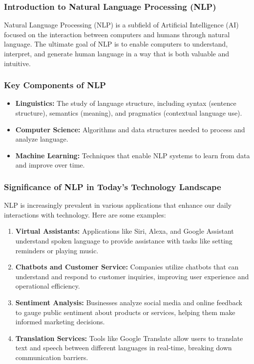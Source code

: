 \documentclass[aspectratio=169]{beamer}
\begin{document}
\frame{\titlepage}

\begin{frame}[fragile]
    \frametitle{Introduction to Natural Language Processing (NLP)}
    Natural Language Processing (NLP) is a subfield of Artificial Intelligence (AI) focused on the interaction between computers and humans through natural language. The ultimate goal of NLP is to enable computers to understand, interpret, and generate human language in a way that is both valuable and intuitive.
\end{frame}

\begin{frame}[fragile]
    \frametitle{Key Components of NLP}
    \begin{itemize}
        \item \textbf{Linguistics:} The study of language structure, including syntax (sentence structure), semantics (meaning), and pragmatics (contextual language use).
        \item \textbf{Computer Science:} Algorithms and data structures needed to process and analyze language.
        \item \textbf{Machine Learning:} Techniques that enable NLP systems to learn from data and improve over time.
    \end{itemize}
\end{frame}

\begin{frame}[fragile]
    \frametitle{Significance of NLP in Today's Technology Landscape}
    NLP is increasingly prevalent in various applications that enhance our daily interactions with technology. Here are some examples:
    \begin{enumerate}
        \item \textbf{Virtual Assistants:} Applications like Siri, Alexa, and Google Assistant understand spoken language to provide assistance with tasks like setting reminders or playing music.
        \item \textbf{Chatbots and Customer Service:} Companies utilize chatbots that can understand and respond to customer inquiries, improving user experience and operational efficiency.
        \item \textbf{Sentiment Analysis:} Businesses analyze social media and online feedback to gauge public sentiment about products or services, helping them make informed marketing decisions.
        \item \textbf{Translation Services:} Tools like Google Translate allow users to translate text and speech between different languages in real-time, breaking down communication barriers.
    \end{enumerate}
\end{frame}
\end{document}
